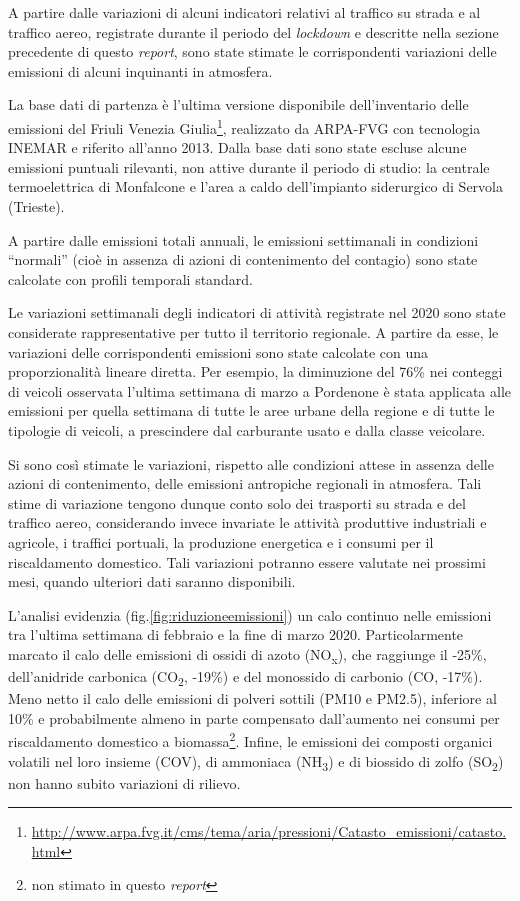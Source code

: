 A partire dalle variazioni di alcuni indicatori relativi al traffico su strada e al traffico aereo, registrate durante il periodo del \textit{lockdown} e descritte nella sezione precedente di questo \textit{report}, sono state stimate le corrispondenti variazioni delle emissioni di alcuni inquinanti in atmosfera.

La base dati di partenza è l'ultima versione disponibile dell'inventario delle emissioni del Friuli Venezia Giulia\footnote{\url{http://www.arpa.fvg.it/cms/tema/aria/pressioni/Catasto_emissioni/catasto.html}}, realizzato da ARPA-FVG con tecnologia INEMAR e riferito all'anno 2013. Dalla base dati sono state escluse alcune emissioni puntuali rilevanti, non attive durante il periodo di studio: la centrale termoelettrica di Monfalcone e l'area a caldo dell'impianto siderurgico di Servola (Trieste).

A partire dalle emissioni totali annuali, le emissioni settimanali in condizioni ``normali'' (cioè in assenza di azioni di contenimento del contagio) sono state calcolate con profili temporali standard.

Le variazioni settimanali degli indicatori di attività registrate nel 2020 sono state considerate rappresentative per tutto il territorio regionale. A partire da esse, le variazioni delle corrispondenti emissioni sono state calcolate con una proporzionalità lineare diretta. Per esempio, la diminuzione del 76\% nei conteggi di veicoli osservata l'ultima settimana di marzo a Pordenone è stata applicata alle emissioni per quella settimana di tutte le aree urbane della regione e di tutte le tipologie di veicoli, a prescindere dal carburante usato e dalla classe veicolare.

Si sono così stimate le variazioni, rispetto alle condizioni attese in assenza delle azioni di contenimento, delle emissioni antropiche regionali in atmosfera. Tali stime di variazione tengono dunque conto solo dei trasporti su strada e del traffico aereo, considerando invece invariate le attività produttive industriali e agricole, i traffici portuali, la produzione energetica e i consumi per il riscaldamento domestico. Tali variazioni potranno essere valutate nei prossimi mesi, quando ulteriori dati saranno disponibili.

L'analisi evidenzia (fig.\ref{fig:riduzioneemissioni}) un calo continuo nelle emissioni tra l'ultima settimana di febbraio e la fine di marzo 2020. Particolarmente marcato il calo delle emissioni di ossidi di azoto (NO\textsubscript{x}), che raggiunge il -25\%, dell'anidride carbonica (CO\textsubscript{2}, -19\%) e del monossido di carbonio (CO, -17\%). Meno netto il calo delle emissioni di polveri sottili (PM10 e PM2.5), inferiore al 10\% e probabilmente almeno in parte compensato dall'aumento nei consumi per riscaldamento domestico a biomassa\footnote{non stimato in questo \textit{report}}. Infine, le emissioni dei composti organici volatili nel loro insieme (COV), di ammoniaca (NH\textsubscript{3}) e di biossido di zolfo (SO\textsubscript{2}) non hanno subito variazioni di rilievo.

